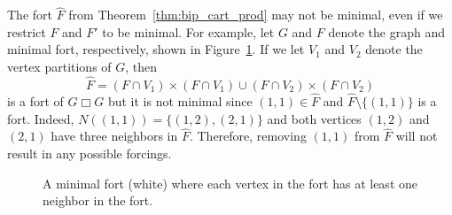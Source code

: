 \documentclass[twoside, 12pt]{article}
\theoremstyle{definition}
\begin{document}
The fort $\hat{F}$  from Theorem~\ref{thm:bip_cart_prod} may not be minimal, even if we restrict $F$ and $F'$ to be minimal. 
For example, let $G$ and $F$ denote the graph and minimal fort, respectively, shown in Figure~\ref{fig:bipartite}.
If we let $V_{1}$ and $V_{2}$ denote the vertex partitions of $G$, then 
\[
\hat{F} = \left(F\cap V_{1}\right)\times\left(F\cap V_{1}\right)\cup\left(F\cap V_{2}\right)\times\left(F\cap V_{2}\right)
\]
is a fort of $G\Box G$ but it is not minimal since $(1,1)\in\hat{F}$ and $\hat{F}\setminus\{(1,1)\}$ is a fort. 
Indeed, $N((1,1))=\{(1,2),(2,1)\}$ and both vertices $(1,2)$ and $(2,1)$ have three neighbors in $\hat{F}$.
Therefore, removing $(1,1)$ from $\hat{F}$ will not result in any possible forcings.
\begin{figure}[ht]
\centering
{}
\caption{A minimal fort (white) where each vertex in the fort has at least one neighbor in the fort.}
\label{fig:bipartite}
\end{figure}
\end{document}
